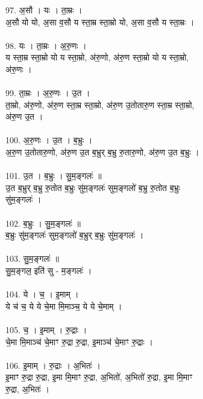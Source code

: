 \subsubsection{}
97. अ॒सौ । यः । ता॒म्रः ।\\
अ॒सौ यो यो, अ॒सा व॒सौ य स्ता॒म्र स्ता॒म्रो यो, अ॒सा व॒सौ य स्ता॒म्रः ।\\
\\
98. यः । ता॒म्रः । अ॒रु॒णः ।\\
य स्ता॒म्र स्ता॒म्रो यो य स्ता॒म्रो, अ॑रु॒णो, अ॑रु॒ण स्ता॒म्रो यो य स्ता॒म्रो,\\
अ॑रु॒णः ।\\
\\
99. ता॒म्रः । अ॒रु॒णः । उ॒त ।\\
ता॒म्रो, अ॑रु॒णो, अ॑रु॒ण स्ता॒म्र स्ता॒म्रो, अ॑रु॒ण उ॒तोतारु॒ण स्ता॒म्र स्ता॒म्रो,\\
अ॑रु॒ण उ॒त ।\\
\\
100. अ॒रु॒णः । उ॒त । ब॒भ्रुः ।\\
अ॒रु॒ण उ॒तोतारु॒णो, अ॑रु॒ण उ॒त ब॒भ्रुर् ब॒भ्रु रु॒तारु॒णो, अ॑रु॒ण उ॒त ब॒भ्रुः ।\\
\\
101. उ॒त । ब॒भ्रुः । सु॒म॒ङ्गलः॑ ॥\\
उ॒त ब॒भ्रुर् ब॒भ्रु रु॒तोत ब॒भ्रुः सु॑म॒ङ्गलः॑ सुम॒ङ्गलो॑ ब॒भ्रु रु॒तोत ब॒भ्रुः\\
सु॑म॒ङ्गलः॑ ।\\
\\
102. ब॒भ्रुः । सु॒म॒ङ्गलः॑ ॥\\
ब॒भ्रुः सु॑म॒ङ्गलः॑ सुम॒ङ्गलो॑ ब॒भ्रुर् ब॒भ्रुः सु॑म॒ङ्गलः॑ ।\\
\\
103. सु॒म॒ङ्गलः॑ ॥\\
सु॒म॒ङ्गल॒ इति॑ सु - म॒ङ्गलः॑ ।\\
\\
104. ये । च॒ । इ॒माम् ।\\
ये च॑ च॒ ये ये चे॒मा मि॒माञ्च॒ ये ये चे॒माम् ।\\
\\
105. च॒ । इ॒माम् । रु॒द्राः ।\\
चे॒मा मि॒माञ्च॑ चे॒माꣳ रु॒द्रा रु॒द्रा, इ॒माञ्च॑ चे॒माꣳ रु॒द्राः ।\\
\\
106. इ॒माम् । रु॒द्राः । अ॒भितः॑ ।\\
इ॒माꣳ रु॒द्रा रु॒द्रा, इ॒मा मि॒माꣳ रु॒द्रा, अ॒भितो॑, अ॒भितो॑ रु॒द्रा, इ॒मा मि॒माꣳ\\
रु॒द्रा, अ॒भितः॑ ।\\
